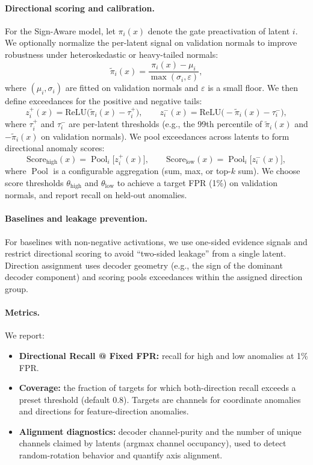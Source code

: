 \documentclass{article}
\begin{document}
\paragraph{Directional scoring and calibration.}
For the Sign-Aware model, let $\pi_i(x)$ denote the gate preactivation of latent $i$. We optionally normalize the per-latent signal on validation normals to improve robustness under heteroskedastic or heavy-tailed normals:
\begin{equation}
    \tilde{\pi}_i(x) = \frac{\pi_i(x) - \mu_i}{\max(\sigma_i, \varepsilon)},
\end{equation}
where $(\mu_i,\sigma_i)$ are fitted on validation normals and $\varepsilon$ is a small floor. We then define exceedances for the positive and negative tails:
\begin{equation}
    z_i^+(x) = \text{ReLU}\big(\tilde{\pi}_i(x) - \tau_i^+\big), \qquad
    z_i^-(x) = \text{ReLU}\big(-\tilde{\pi}_i(x) - \tau_i^-\big),
\end{equation}
where $\tau_i^+$ and $\tau_i^-$ are per-latent thresholds (e.g., the 99th percentile of $\tilde{\pi}_i(x)$ and $-\tilde{\pi}_i(x)$ on validation normals). We pool exceedances across latents to form directional anomaly scores:
\begin{equation}
    \text{Score}_{\text{high}}(x) = \operatorname{Pool}_i\big[z_i^+(x)\big], \qquad
    \text{Score}_{\text{low}}(x)  = \operatorname{Pool}_i\big[z_i^-(x)\big],
\end{equation}
where $\operatorname{Pool}$ is a configurable aggregation (sum, max, or top-$k$ sum). We choose score thresholds $\theta_{\text{high}}$ and $\theta_{\text{low}}$ to achieve a target FPR (1\%) on validation normals, and report recall on held-out anomalies.

\paragraph{Baselines and leakage prevention.}
For baselines with non-negative activations, we use one-sided evidence signals and restrict directional scoring to avoid ``two-sided leakage'' from a single latent. Direction assignment uses decoder geometry (e.g., the sign of the dominant decoder component) and scoring pools exceedances within the assigned direction group.

\paragraph{Metrics.}
We report:
\begin{itemize}
    \item \textbf{Directional Recall @ Fixed FPR:} recall for high and low anomalies at 1\% FPR.
    \item \textbf{Coverage:} the fraction of targets for which both-direction recall exceeds a preset threshold (default 0.8). Targets are channels for coordinate anomalies and directions for feature-direction anomalies.
    \item \textbf{Alignment diagnostics:} decoder channel-purity and the number of unique channels claimed by latents (argmax channel occupancy), used to detect random-rotation behavior and quantify axis alignment.
\end{itemize}
\end{document}
